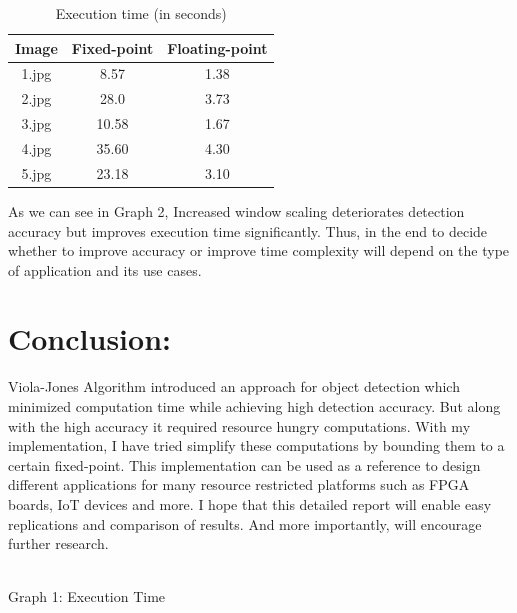 \documentclass[12pt]{elsarticle}
\begin{document}
\begin{table}[h!]
\centering
\begin{tabular}{||c|c|c||} 
 \hline
 Image & Fixed-point & Floating-point \\ [0.5ex] 
 \hline\hline
 1.jpg & 8.57 & 1.38  \\ 
 2.jpg & 28.0 & 3.73  \\
 3.jpg & 10.58 & 1.67 \\
 4.jpg & 35.60 & 4.30 \\
 5.jpg & 23.18 & 3.10 \\ [1ex] 
 \hline
\end{tabular}
\caption{Execution time (in seconds)}
\label{table:1}
\end{table}

As we can see in Graph 2, Increased window scaling deteriorates detection accuracy but improves execution time significantly. Thus, in the end to decide whether to improve accuracy or improve time complexity will depend on the type of application and its use cases.

\section{Conclusion:}
\label{S:4}
Viola-Jones Algorithm \cite{Three} introduced an approach for object detection which minimized computation time while achieving high detection accuracy. But along with the high accuracy it required resource hungry computations. With my implementation, I have tried simplify these computations by bounding them to a certain fixed-point. This implementation can be used as a reference to design different applications for many resource restricted platforms such as FPGA boards, IoT devices and more. I hope that this detailed report will enable easy replications and comparison of results. And more importantly, will encourage further research.

\begin{center}
\\Graph 1: Execution Time
\end{center}
\end{document}
